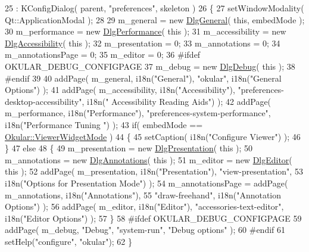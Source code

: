 \begin{DoxyCode}
25     : KConfigDialog( parent, \textcolor{stringliteral}{"preferences"}, skeleton )
26 \{
27     setWindowModality( Qt::ApplicationModal );
28 
29     m\_general = \textcolor{keyword}{new} \hyperlink{classDlgGeneral}{DlgGeneral}( \textcolor{keyword}{this}, embedMode );
30     m\_performance = \textcolor{keyword}{new} \hyperlink{classDlgPerformance}{DlgPerformance}( \textcolor{keyword}{this} );
31     m\_accessibility = \textcolor{keyword}{new} \hyperlink{classDlgAccessibility}{DlgAccessibility}( \textcolor{keyword}{this} );
32     m\_presentation = 0;
33     m\_annotations = 0;
34     m\_annotationsPage = 0;
35     m\_editor = 0;
36 \textcolor{preprocessor}{#ifdef OKULAR\_DEBUG\_CONFIGPAGE}
37     m\_debug = \textcolor{keyword}{new} \hyperlink{classDlgDebug}{DlgDebug}( \textcolor{keyword}{this} );
38 \textcolor{preprocessor}{#endif}
39 
40     addPage( m\_general, i18n(\textcolor{stringliteral}{"General"}), \textcolor{stringliteral}{"okular"}, i18n(\textcolor{stringliteral}{"General Options"}) );
41     addPage( m\_accessibility, i18n(\textcolor{stringliteral}{"Accessibility"}), \textcolor{stringliteral}{"preferences-desktop-accessibility"}, i18n(\textcolor{stringliteral}{"
      Accessibility Reading Aids"}) );
42     addPage( m\_performance, i18n(\textcolor{stringliteral}{"Performance"}), \textcolor{stringliteral}{"preferences-system-performance"}, i18n(\textcolor{stringliteral}{"Performance Tuning
      "}) );
43     \textcolor{keywordflow}{if}( embedMode == \hyperlink{namespaceOkular_adbe21e337d65d3f5f07a441180428ba8aebaf7bae8bd4303bad7c4ca29057c472}{Okular::ViewerWidgetMode} )
44     \{
45         setCaption( i18n(\textcolor{stringliteral}{"Configure Viewer"}) );
46     \}
47     \textcolor{keywordflow}{else}
48     \{
49         m\_presentation = \textcolor{keyword}{new} \hyperlink{classDlgPresentation}{DlgPresentation}( \textcolor{keyword}{this} );
50         m\_annotations = \textcolor{keyword}{new} \hyperlink{classDlgAnnotations}{DlgAnnotations}( \textcolor{keyword}{this} );
51         m\_editor = \textcolor{keyword}{new} \hyperlink{classDlgEditor}{DlgEditor}( \textcolor{keyword}{this} );
52         addPage( m\_presentation, i18n(\textcolor{stringliteral}{"Presentation"}), \textcolor{stringliteral}{"view-presentation"},
53                  i18n(\textcolor{stringliteral}{"Options for Presentation Mode"}) );
54         m\_annotationsPage = addPage( m\_annotations, i18n(\textcolor{stringliteral}{"Annotations"}),
55                                      \textcolor{stringliteral}{"draw-freehand"}, i18n(\textcolor{stringliteral}{"Annotation Options"}) );
56         addPage( m\_editor, i18n(\textcolor{stringliteral}{"Editor"}), \textcolor{stringliteral}{"accessories-text-editor"}, i18n(\textcolor{stringliteral}{"Editor Options"}) );
57     \}
58 \textcolor{preprocessor}{#ifdef OKULAR\_DEBUG\_CONFIGPAGE}
59     addPage( m\_debug, \textcolor{stringliteral}{"Debug"}, \textcolor{stringliteral}{"system-run"}, \textcolor{stringliteral}{"Debug options"} );
60 \textcolor{preprocessor}{#endif}
61     setHelp(\textcolor{stringliteral}{"configure"}, \textcolor{stringliteral}{"okular"});
62 \}
\end{DoxyCode}


